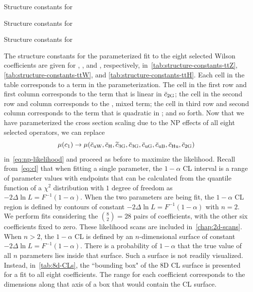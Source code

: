 \begin{landscape}
  \begin{table}
    \caption{Structure constants for \ttZ}
    \label{tab:structure-constants-ttZ}
    
  \end{table}
  \begin{table}
    \caption{Structure constants for \ttW}
    
    \label{tab:structure-constants-ttW}
  \end{table}
  \begin{table}
    \caption{Structure constants for \ttH}
    
    \label{tab:structure-constants-ttH}
  \end{table}
\end{landscape}

The structure constants for the parameterized fit to the eight selected Wilson
coefficients are given for \ttZ, \ttW, and \ttH, respectively,
in~\cref{tab:structure-constants-ttZ}, \cref{tab:structure-constants-ttW}, and
\cref{tab:structure-constants-ttH}. Each cell in the table corresponds to a term
in the parameterization. The cell in the first row and first column corresponds
to the term that is linear in $\bar{c}_{\text{2G}}$; the cell in the second row and column
corresponds to the \ctwoG, \cthreeG mixed term; the cell in third row and second
column corresponds to the term that is quadratic in \cthreeG; and so forth. Now
that we have parameterized the cross section scaling due to the NP effects of
all eight selected operators, we can replace
\begin{equation}
  \mu(c_1) \rightarrow \mu(\bar{c}_{\text{uW}},\bar{c}_{\text{H}},\widetilde{c}_{\text{3G}},\bar{c}_{\text{3G}},\bar{c}_{\text{uG}},\bar{c}_{\text{uB}},\bar{c}_{\text{Hu}},\bar{c}_{\text{2G}})
\end{equation}
in~\cref{eq:np-likelihood} and proceed as before to maximize the likelihood. Recall from~\cref{eq:cl} that when fitting a single parameter, the $1 - \alpha$ CL interval is a range of parameter values with endpoints that can be calculated from the quantile function of a $\chi^2$ distribution with $1$ degree of freedom as $-2\Delta\ln L = F^{-1}(1 - \alpha)$. When the two parameters are being fit, the $1 - \alpha$ CL region is defined by contours of constant $-2\Delta\ln L = F^{-1}(1 - \alpha)$ with $n=2$. We perform fits considering the $\binom{8}{2}=28$ pairs of coefficients, with the other six coefficients fixed to zero. These likelihood scans are included in~\cref{chap:2d-scans}. When $n>2$, the $1 - \alpha$ CL is defined by an $n$-dimensional surface of constant $-2\Delta\ln L = F^{-1}(1 - \alpha)$. There is a probability of $1 - \alpha$ that the true value of all $n$ parameters lies inside that surface. Such a surface is not readily visualized. Instead, in~\cref{tab:8d-CLs}, the ``bounding box" of the 8D CL surface is presented for a fit to all eight coefficients. The range for each coefficient corresponds to the dimensions along that axis of a box that would contain the CL surface.


